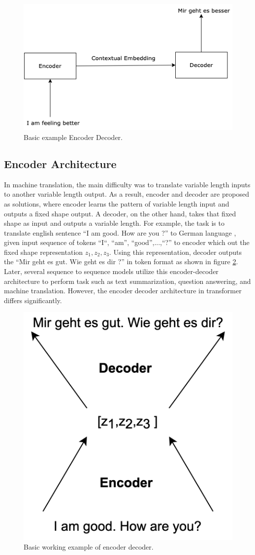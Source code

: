\documentclass[%
	BCOR=8mm, %
	DIV=12,
	toc=bibliography, %
	toc=listof, %
	oneside, %
	egregdoesnotlikesansseriftitles, %
	]{scrbook}
\begin{document}
\begin{figure}[h!]
\centering
\includegraphics[width=.50\textwidth]{img/encoderDecoder.png}
\caption[Basic example of encoder and decoder]{Basic example Encoder Decoder.}
\label{diag:EncoderDecoder}
\end{figure}

\subsection{Encoder Architecture}
In machine translation, the main difficulty was to translate variable length inputs to another variable length output. As a result, encoder and decoder are proposed as solutions, where encoder learns the pattern of variable length input and outputs a fixed shape output. A decoder, on the other hand, takes that fixed shape as input and outputs a variable length. 
For example, the task is to translate english sentence ``I am good. How are you ?'' to German language , given input sequence of tokens ``I``, ``am'', ``good'',...,``?'' to encoder which out the fixed shape representation $z_{1},z_{2},z_{3}$. Using this representation, decoder outputs the ``Mir geht es gut. Wie geht es dir ?'' in token format as shown in figure \ref{diag:EncoderDecoderExp}. Later, several sequence to sequence models utilize this encoder-decoder architecture to perform task such as text summarization, question answering, and machine translation. However, the encoder decoder architecture in transformer differs significantly.\\
\begin{figure}[H]
\centering
\includegraphics[width=.30\textwidth]{img/EncoderDecoder2.png}
\caption[Basic example of encoder and decoder working]{Basic working example of encoder decoder.}
\label{diag:EncoderDecoderExp}
\end{figure}
\end{document}
